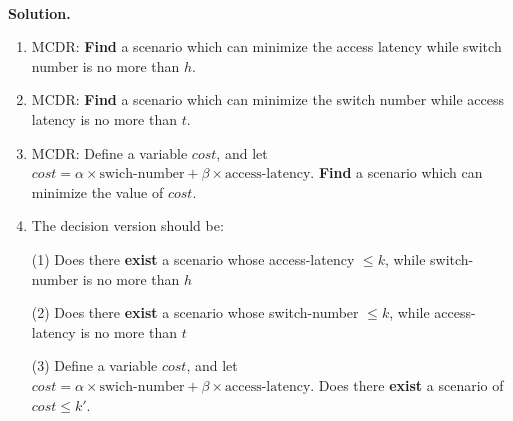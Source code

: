 \documentclass[12pt,a4paper]{article}
\theoremstyle{definition}
\begin{document}
\begin{enumerate}
		~\\
		\textbf{Solution.}
		\begin{enumerate}
			\item MCDR: \textbf{Find} a scenario which can minimize the access latency while switch number is no more than $h$.
			\item MCDR: \textbf{Find} a scenario which can minimize the switch number while access latency is no more than $t$.
			\item MCDR: Define a variable $cost$, and let $cost=\alpha\times \text{swich-number}+\beta\times \text{access-latency}$. \textbf{Find} a scenario which can minimize the value of $cost$.
			\item The decision version should be:
			
			(1) Does there \textbf{exist} a scenario whose access-latency $\leq k$,  while switch-number is no more than $h$
			
			(2) Does there \textbf{exist} a scenario whose switch-number $\leq k$,  while access-latency is no more than $t$
			
			(3) Define a variable $cost$, and let $cost=\alpha\times \text{swich-number}+\beta\times \text{access-latency}$. Does there \textbf{exist} a scenario of $ cost\leq k'$.
			
			
		\end{enumerate}
		
	\end{enumerate}
	
\end{document}
